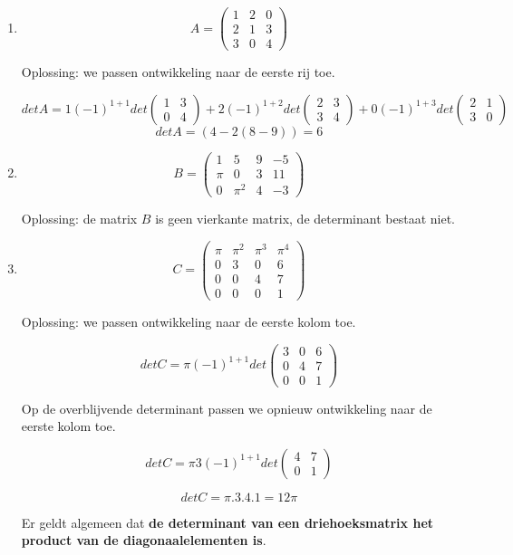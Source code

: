 \begin{enumerate}
	\item \[ A=\left( \begin{matrix}
	1 & 2 & 0 \\
	2 & 1 & 3 \\
	3 & 0 & 4 \end{matrix} \right)
	\]
	
	Oplossing: we passen ontwikkeling naar de eerste rij toe.
	
	\[
	det A= 1 (-1)^{1+1} det \left( \begin{matrix} 
	1 & 3 \\ 0 & 4 \end{matrix} \right) + 2 (-1)^{1+2} det \left( \begin{matrix}
	2 & 3 \\ 3 & 4 \end{matrix} \right) + 0 (-1)^{1+3} det \left( \begin{matrix}
	2 & 1 \\ 3 & 0 \end{matrix} \right)
	\]
	\[ det A=(4-2(8-9))=6 \] 
	
	\item \[ B=\left( \begin{matrix}
	1 & 5 & 9 & -5 \\
	\pi & 0 & 3 & 11 \\
	0 & \pi^2 & 4 & -3
	\end{matrix} \right)
	\]
	
	Oplossing: de matrix $B$ is geen vierkante matrix, de determinant bestaat niet.
	
	\item \[ C=\left( \begin{matrix}
	\pi & \pi^2 & \pi^3 & \pi^4 \\
	0   &  3    &   0   &   6   \\
	0   &  0    &   4   &   7   \\
	0   &  0    &   0   &   1  
	\end{matrix} \right)
	\]
	
	Oplossing: we passen ontwikkeling naar de eerste kolom toe.
	
	\[ det C= \pi (-1)^{1+1} det \left( \begin{matrix}
		3    &   0   &   6   \\
		0    &   4   &   7   \\
		0    &   0   &   1  
	\end{matrix} \right) \]
	
	Op de overblijvende determinant passen we opnieuw ontwikkeling naar de eerste kolom toe.
	
	\[ det C= \pi 3 (-1)^{1+1} det \left( \begin{matrix}
	4 & 7 \\ 0 & 1 
	\end{matrix} \right) \]
	
	\[ det C = \pi.3.4.1 = 12\pi \]
	
	Er geldt algemeen dat {\bf de determinant van een driehoeksmatrix het product van de diagonaalelementen is}. 
	
\end{enumerate}

